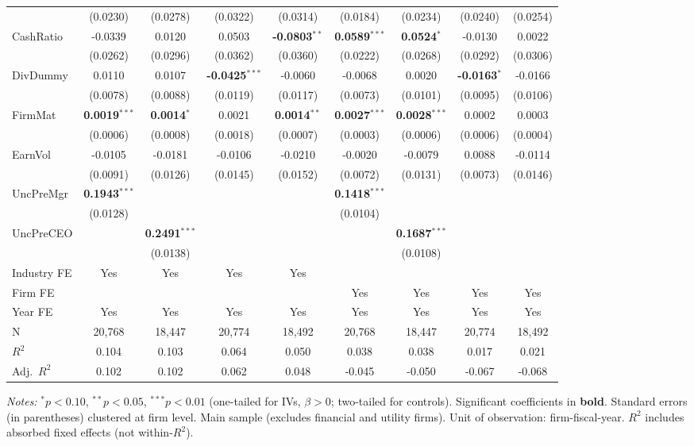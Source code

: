 \documentclass[11pt,a4paper]{article}
\begin{document}
\begin{table}[htbp]
\begin{tabular}{lcccccccc}
 & (0.0230) & (0.0278) & (0.0322) & (0.0314) & (0.0184) & (0.0234) & (0.0240) & (0.0254) \\
CashRatio & -0.0339 & 0.0120 & 0.0503 & \textbf{-0.0803}$^{**}$ & \textbf{0.0589}$^{***}$ & \textbf{0.0524}$^{*}$ & -0.0130 & 0.0022 \\
 & (0.0262) & (0.0296) & (0.0362) & (0.0360) & (0.0222) & (0.0268) & (0.0292) & (0.0306) \\
DivDummy & 0.0110 & 0.0107 & \textbf{-0.0425}$^{***}$ & -0.0060 & -0.0068 & 0.0020 & \textbf{-0.0163}$^{*}$ & -0.0166 \\
 & (0.0078) & (0.0088) & (0.0119) & (0.0117) & (0.0073) & (0.0101) & (0.0095) & (0.0106) \\
FirmMat & \textbf{0.0019}$^{***}$ & \textbf{0.0014}$^{*}$ & 0.0021 & \textbf{0.0014}$^{**}$ & \textbf{0.0027}$^{***}$ & \textbf{0.0028}$^{***}$ & 0.0002 & 0.0003 \\
 & (0.0006) & (0.0008) & (0.0018) & (0.0007) & (0.0003) & (0.0006) & (0.0006) & (0.0004) \\
EarnVol & -0.0105 & -0.0181 & -0.0106 & -0.0210 & -0.0020 & -0.0079 & 0.0088 & -0.0114 \\
 & (0.0091) & (0.0126) & (0.0145) & (0.0152) & (0.0072) & (0.0131) & (0.0073) & (0.0146) \\
UncPreMgr & \textbf{0.1943}$^{***}$ &  &  &  & \textbf{0.1418}$^{***}$ &  &  &  \\
 & (0.0128) &  &  &  & (0.0104) &  &  &  \\
UncPreCEO &  & \textbf{0.2491}$^{***}$ &  &  &  & \textbf{0.1687}$^{***}$ &  &  \\
 &  & (0.0138) &  &  &  & (0.0108) &  &  \\
\midrule
Industry FE & Yes & Yes & Yes & Yes &  &  &  &  \\
Firm FE &  &  &  &  & Yes & Yes & Yes & Yes \\
Year FE & Yes & Yes & Yes & Yes & Yes & Yes & Yes & Yes \\
\midrule
N & 20,768 & 18,447 & 20,774 & 18,492 & 20,768 & 18,447 & 20,774 & 18,492 \\
$R^2$ & 0.104 & 0.103 & 0.064 & 0.050 & 0.038 & 0.038 & 0.017 & 0.021 \\
Adj.~$R^2$ & 0.102 & 0.102 & 0.062 & 0.048 & -0.045 & -0.050 & -0.067 & -0.068 \\
\bottomrule
\end{tabular}
\begin{minipage}{\linewidth}
\vspace{2pt}\scriptsize
\textit{Notes:} $^{*}p<0.10$, $^{**}p<0.05$, $^{***}p<0.01$ (one-tailed for IVs, $\beta > 0$; two-tailed for controls).
 Significant coefficients in \textbf{bold}.
 Standard errors (in parentheses) clustered at firm level.
 Main sample (excludes financial and utility firms). Unit of observation: firm-fiscal-year.
 $R^2$ includes absorbed fixed effects (not within-$R^2$).
\end{minipage}
\end{table}
\end{document}

